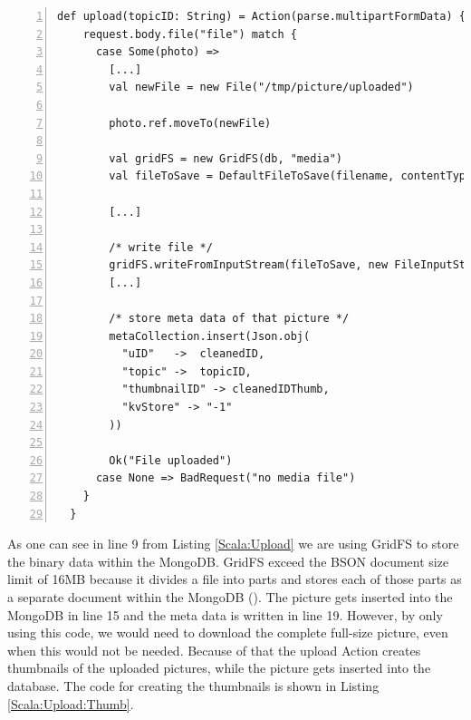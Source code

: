 \begin{lstlisting}[numbers=left,caption={Snippet of the upload Action of the FileController for uploading pictures},label=Scala:Upload,frame=tlbr,breaklines]
def upload(topicID: String) = Action(parse.multipartFormData) { request =>
    request.body.file("file") match {
      case Some(photo) =>
        [...]
        val newFile = new File("/tmp/picture/uploaded")

        photo.ref.moveTo(newFile)

        val gridFS = new GridFS(db, "media")
        val fileToSave = DefaultFileToSave(filename, contentType)

        [...]

        /* write file */
        gridFS.writeFromInputStream(fileToSave, new FileInputStream(newFile))
        [...]

        /* store meta data of that picture */
        metaCollection.insert(Json.obj(
          "uID"   ->  cleanedID,
          "topic" ->  topicID,
          "thumbnailID" -> cleanedIDThumb,
          "kvStore" -> "-1"
        ))

        Ok("File uploaded")
      case None => BadRequest("no media file")
    }
  }
\end{lstlisting}

As one can see in line 9 from Listing \ref{Scala:Upload} we are using GridFS to store the binary data within the MongoDB. GridFS exceed the \ac{BSON} document size limit of 16MB because it divides a file into parts and stores each of those parts as a separate document within the MongoDB (\cite{gridfs}). The picture gets inserted into the MongoDB in line 15 and the meta data is written in line 19. However, by only using this code, we would need to download the complete full-size picture, even when this would not be needed. Because of that the upload Action creates thumbnails of the uploaded pictures, while the picture gets inserted into the database. The code for creating the thumbnails is shown in Listing \ref{Scala:Upload:Thumb}.


